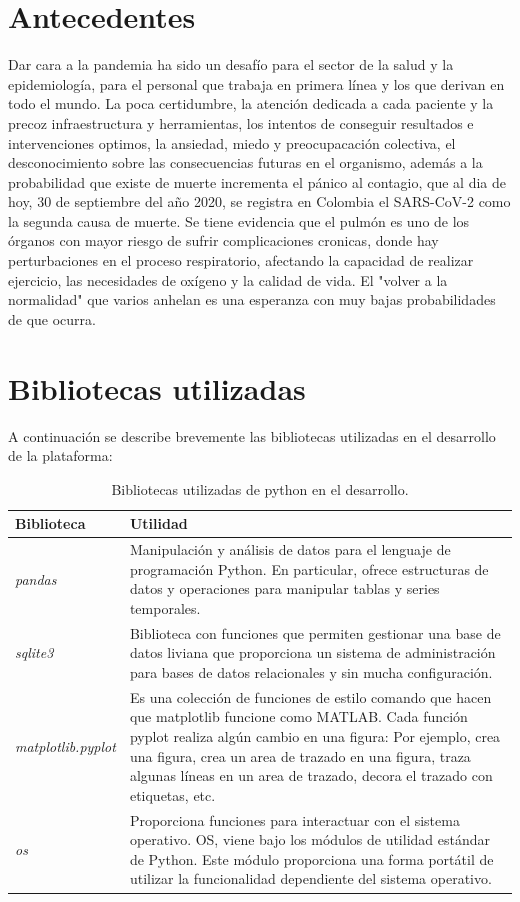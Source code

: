 \documentclass[conference,compsoc,onecolumn]{IEEEtran}
\begin{document}
\section{Antecedentes}
Dar cara a la pandemia ha sido un desafío para el sector de la salud y la epidemiología, para el personal que trabaja en primera línea y los que derivan en todo el mundo. La poca certidumbre, la atención dedicada a cada paciente y la precoz infraestructura y herramientas, los intentos de conseguir resultados e intervenciones optimos, la ansiedad, miedo y preocupacación colectiva, el desconocimiento sobre las consecuencias futuras en el organismo, además a la probabilidad que existe de muerte incrementa el pánico al contagio, que al dia de hoy, 30 de septiembre del año 2020, se registra en Colombia el SARS-CoV-2  como la segunda causa de muerte. 
\medskip
Se tiene evidencia que el pulmón es uno de los órganos con mayor riesgo de sufrir complicaciones cronicas, donde hay perturbaciones en el proceso respiratorio, afectando la capacidad de realizar ejercicio, las necesidades de oxígeno y la calidad de vida. El "volver a la normalidad" que varios anhelan es una esperanza con muy bajas probabilidades de que ocurra. 
\label{sec:results}

\section{Bibliotecas utilizadas}
A continuación se describe brevemente las bibliotecas utilizadas en el desarrollo de la plataforma:

 \begin{table}[H]
    \centering
    \begin{tabular}[c]{| m{15em} | m{35em} |} 
     \hline
     \textbf{Biblioteca} & \textbf{Utilidad}\\
     \hline
      \textit{pandas} & Manipulación y análisis de datos para el lenguaje de programación Python. En particular, ofrece estructuras de datos y operaciones para manipular tablas y series temporales.\\ 
     \hline
      \textit{sqlite3} & Biblioteca con funciones que permiten gestionar una base de datos liviana que proporciona un sistema de administración para bases de datos relacionales y sin mucha configuración.\\
     \hline
      \textit{matplotlib.pyplot} & Es una colección de funciones de estilo comando que hacen que matplotlib funcione como MATLAB. Cada función pyplot realiza algún cambio en una figura: Por ejemplo, crea una figura, crea un area de trazado en una figura, traza algunas líneas en un area de trazado, decora el trazado con etiquetas, etc.  \\ 
     \hline
      \textit{os} & Proporciona funciones para interactuar con el sistema operativo. OS, viene bajo los módulos de utilidad estándar de Python. Este módulo proporciona una forma portátil de utilizar la funcionalidad dependiente del sistema operativo. \\
     \hline
    \end{tabular}
    \caption{Bibliotecas utilizadas de python en el desarrollo.}
    \label{table:ta}
    \end{table}
\end{document}
